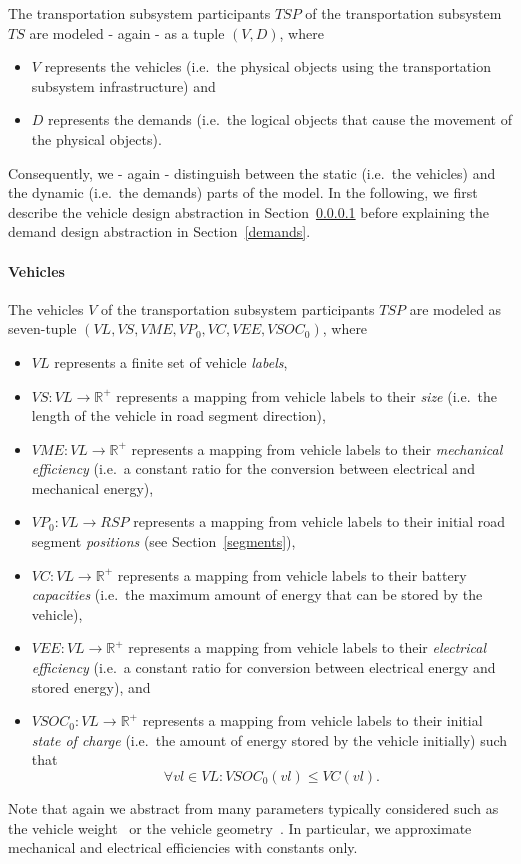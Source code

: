 The transportation subsystem participants $TSP$ of the transportation subsystem $TS$ are modeled - again - as a tuple $(V, D)$, where
\begin{itemize}
	\item $V$ represents the vehicles (i.e.\ the physical objects using the transportation subsystem infrastructure) and
	\item $D$ represents the demands (i.e.\ the logical objects that cause the movement of the physical objects).
\end{itemize}
Consequently, we - again - distinguish between the static (i.e.\ the vehicles) and the dynamic (i.e.\ the demands) parts of the model. In the following, we first describe the vehicle design abstraction in Section~\ref{vehicles} before explaining the demand design abstraction in Section~\ref{demands}.

\paragraph{Vehicles}
\label{vehicles}

The vehicles $V$ of the transportation subsystem participants $TSP$ are modeled as seven-tuple $(VL, VS, VME, VP_0, VC, VEE, VSOC_0)$, where
\begin{itemize}
	\item $VL$ represents a finite set of vehicle \textit{labels},
	\item $VS: VL \rightarrow \mathbb{R}^+$ represents a mapping from vehicle labels to their \textit{size} (i.e.\ the length of the vehicle in road segment direction),
	\item $VME: VL \rightarrow \mathbb{R}^+$ represents a mapping from vehicle labels to their \textit{mechanical efficiency} (i.e.\ a constant ratio for the conversion between electrical and mechanical energy),
	\item $VP_0: VL \rightarrow RSP$ represents a mapping from vehicle labels to their initial road segment \textit{positions} (see Section~\ref{segments}),
	\item $VC: VL \rightarrow \mathbb{R}^+$ represents a mapping from vehicle labels to their battery \textit{capacities} (i.e.\ the maximum amount of energy that can be stored by the vehicle),
	\item $VEE: VL \rightarrow \mathbb{R}^+$ represents a mapping from vehicle labels to their \textit{electrical efficiency} (i.e.\ a constant ratio for conversion between electrical energy and stored energy), and
	\item $VSOC_0: VL \rightarrow \mathbb{R}^+$ represents a mapping from vehicle labels to their initial \textit{state of charge} (i.e.\ the amount of energy stored by the vehicle initially) such that
	\[
		\forall vl \in VL : VSOC_0(vl) \leq VC(vl) \textrm{.}
	\]
\end{itemize}
Note that again we abstract from many parameters typically considered such as the vehicle weight~\cite{?} or the vehicle geometry~\cite{?}. In particular, we approximate mechanical and electrical efficiencies with constants only.

